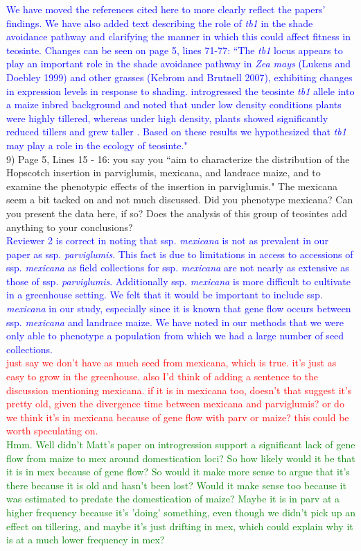 \documentclass[11pt]{article}
\newcommand{\res}[1]{\noindent \textcolor{blue}{{#1}} \\}
\newcommand{\jri}[1]{\noindent \textcolor{red}{{#1}} \\}
\newcommand{\lev}[1]{\noindent \textcolor{green}{{#1}} \\}
\begin{document}
\res{We have moved the references cited here to more clearly reflect the papers' findings.  We have also added text describing the role of \emph{tb1} in the shade avoidance pathway and clarifying the manner in which this could affect fitness in teosinte. Changes can be seen on page 5, lines 71-77: ``The \emph{tb1} locus appears to play an important role in the shade avoidance pathway in \emph{Zea mays} (Lukens and Doebley 1999) and other grasses (Kebrom and Brutnell 2007), exhibiting changes in expression levels in response to shading. \citet{LukensDoebley1999} introgressed the teosinte \emph{tb1} allele into a maize inbred background and noted that under low density conditions plants were highly tillered, whereas under high density, plants showed significantly reduced tillers and grew taller \citep{LukensDoebley1999}. Based on these results we hypothesized that \emph{tb1} may play a role in the ecology of teosinte."}

9) Page 5, Lines 15 - 16: you say you ``aim to characterize the distribution of the Hopscotch insertion in parviglumis, mexicana, and landrace maize, and to examine the phenotypic effects of the insertion in parviglumis."  The mexicana seem a bit tacked on and not much discussed. Did you phenotype mexicana? Can you present the data here, if so? Does the analysis of this group of teosintes add anything to your conclusions?\\

\res{Reviewer 2 is correct in noting that ssp. \emph{mexicana} is not as prevalent in our paper as ssp. \emph{parviglumis}. This fact is due to limitations in access to accessions of ssp. \emph{mexicana} as field collections for ssp. \emph{mexicana} are not nearly as extensive as those of ssp. \emph{parviglumis}. Additionally ssp. \emph{mexicana} is more difficult to cultivate in a greenhouse setting. We felt that it would be important to include ssp. \emph{mexicana} in our study, especially since it is known that gene flow occurs between ssp. \emph{mexicana} and landrace maize. We have noted in our methods that we were only able to phenotype a population from which we had a large number of seed collections.} \jri{just say we don't have as much seed from mexicana, which is true. it's just as easy to grow in the greenhouse. also I'd think of adding a sentence to the discussion mentioning mexicana. if it is in mexicana too, doesn't that suggest it's pretty old, given the divergence time between mexicana and parviglumis? or do we think it's in mexicana because of gene flow with parv or maize? this could be worth speculating on.}
\lev{Hmm. Well didn't Matt's paper on introgression support a significant lack of gene flow from maize to mex around domestication loci? So how likely would it be that it is in mex because of gene flow? So would it make more sense to argue that it's there because it is old and hasn't been lost? Would it make sense too because it was estimated to predate the domestication of maize? Maybe it is in parv at a higher frequency because it's 'doing' something, even though we didn't pick up an effect on tillering, and maybe it's just drifting in mex, which could explain why it is at a much lower frequency in mex?}
\end{document}
